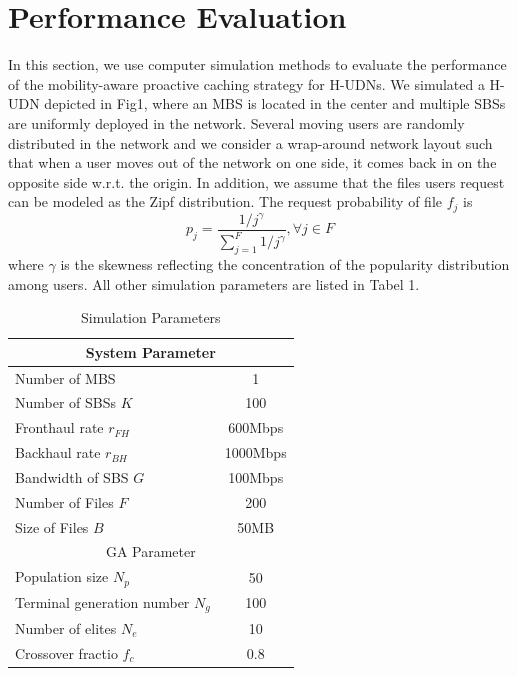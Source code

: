 \documentclass[conference]{IEEEtran}
\begin{document}
\section{Performance Evaluation}
In this section, we use computer simulation methods to evaluate the performance of the mobility-aware proactive caching strategy for H-UDNs. We simulated a H-UDN depicted in Fig1, where an MBS is located in the center and multiple SBSs are uniformly deployed in the network. Several moving users are randomly distributed in the network and we consider a wrap-around network layout such that when a user moves out of the network on one side, it comes back in on the opposite side w.r.t. the origin. In addition, we assume that the files users request can be modeled as the Zipf distribution\cite{6736753}. The request probability of file $f_j$ is
$$p_j=\frac{1/j^\gamma}{\sum_{j=1}^F 1/j^\gamma}, \forall j\in F$$
where $\gamma$ is the skewness reflecting the concentration of the popularity distribution among users. All other simulation parameters are listed in Tabel 1.

\begin{table}[htbp]
 \caption{Simulation Parameters}
 \setlength{\tabcolsep}{7mm}
 \begin{center}
  \begin{tabular}{|l|c|}
   \hline
   \multicolumn{2}{|c|}{System Parameter}                \\\hline
   Number of MBS                  & 1                 \\ \hline
   Number of SBSs $K$             & 100                \\\hline
   Fronthaul rate $r_{FH}$        & 600Mbps               \\ \hline
   Backhaul rate $r_{BH}$         & 1000Mbps               \\\hline
   Bandwidth of SBS $G$           &  100Mbps              \\\hline
   Number of Files $F$            & 200               \\\hline
   Size of Files $B$              & 50MB            \\\hline
   \multicolumn{2}{|c|}{GA Parameter}                \\\hline
   Population size $N_p$          & 50              \\\hline
   Terminal generation number $N_g$ & 100               \\\hline
   Number of elites $N_e$         & 10              \\\hline
   Crossover fractio $f_c$        & 0.8            \\\hline
  \end{tabular}
  \label{tab1}
 \end{center}
\end{table}
\end{document}
